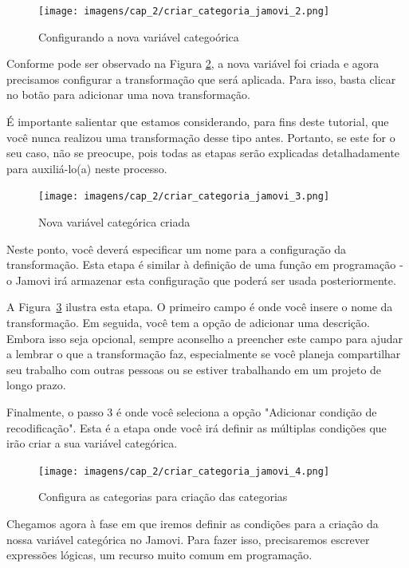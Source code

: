 \begin{figure}[H]
    \centering
    \caption{Configurando a nova variável categoórica}
    \texttt{[image: imagens/cap\_2/criar\_categoria\_jamovi\_2.png]}
    \label{fig:criar_categoria_jamovi_2}
\end{figure}

Conforme pode ser observado na Figura \ref{fig:criar_categoria_jamovi_3}, a nova variável foi criada e agora precisamos configurar a transformação que será aplicada. Para isso, basta clicar no botão para adicionar uma nova transformação.

É importante salientar que estamos considerando, para fins deste tutorial, que você nunca realizou uma transformação desse tipo antes. Portanto, se este for o seu caso, não se preocupe, pois todas as etapas serão explicadas detalhadamente para auxiliá-lo(a) neste processo.

\begin{figure}[H]
    \centering
    \caption{Nova variável categórica criada}
    \texttt{[image: imagens/cap\_2/criar\_categoria\_jamovi\_3.png]}
    \label{fig:criar_categoria_jamovi_3}
\end{figure}

Neste ponto, você deverá especificar um nome para a configuração da transformação. Esta etapa é similar à definição de uma função em programação - o Jamovi irá armazenar esta configuração que poderá ser usada posteriormente.

A Figura~\ref{fig:criar_categoria_jamovi_4} ilustra esta etapa. O primeiro campo é onde você insere o nome da transformação. Em seguida, você tem a opção de adicionar uma descrição. Embora isso seja opcional, sempre aconselho a preencher este campo para ajudar a lembrar o que a transformação faz, especialmente se você planeja compartilhar seu trabalho com outras pessoas ou se estiver trabalhando em um projeto de longo prazo.

Finalmente, o passo 3 é onde você seleciona a opção "Adicionar condição de recodificação". Esta é a etapa onde você irá definir as múltiplas condições que irão criar a sua variável categórica.

\begin{figure}[H]
    \centering
    \caption{Configura as categorias para criação das categorias}
    \texttt{[image: imagens/cap\_2/criar\_categoria\_jamovi\_4.png]}
    \label{fig:criar_categoria_jamovi_4}
\end{figure}

Chegamos agora à fase em que iremos definir as condições para a criação da nossa variável categórica no Jamovi. Para fazer isso, precisaremos escrever expressões lógicas, um recurso muito comum em programação. 

